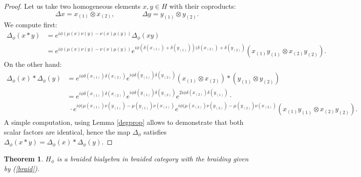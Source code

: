 \documentclass[12pt]{amsart}
\newtheorem{thm}{Theorem}[section]
\theoremstyle{definition}
\numberwithin{equation}{section}
\newcommand{\cop}{\Delta}           %
\begin{document}
\begin{proof}
Let us take two homogeneous elements $x,y \in H$ with their coproducts:
$$ \Delta x = x_{(1)} \otimes  x_{(2)}, \qquad \qquad  \Delta y = y_{(1)} \otimes  y_{(2)}. $$
We compute first:
$$
\begin{aligned}
\Delta_\phi (x \ast y) & =  e^{i \phi(\mu(x) \nu(y)  - \nu(x) \mu(y))} \Delta_\phi(xy) \\
& = e^{i \phi(\mu(x) \nu(y)  - \nu(x) \mu(y))} 
e^{ i \phi (\delta(x_{(1)}) +  \delta(y_{(1)}))(\delta(x_{(2)}) + \delta(y_{(2)})}
 \left( x_{(1)} y_{(1)} \otimes  x_{(2)} y_{(2)} \right).
\end{aligned}
$$
On the other hand:
$$
\begin{aligned}
\Delta_\phi(x) \ast \Delta_\phi(y) &= 
e^{ i \phi \delta(x_{(1)})  \delta(x_{(2)})}  
e^{ i \phi \delta(y_{(1)})  \delta(y_{(2)})}  
\left( x_{(1)} \otimes  x_{(2)} \right) \ast \left( y_{(1)} \otimes  y_{(2)} \right) \\
&= 
e^{ i \phi \delta(x_{(1)})  \delta(x_{(2)})}  
e^{ i \phi \delta(y_{(1)})  \delta(y_{(2)})}  
e^{2 i \phi \delta(x_{(2)})  \delta(y_{(1)})}  \cdot \\
& \,\, \cdot e^{ i \phi (\mu(x_{(1)}) \nu(y_{(1)})  - \mu(y_{(1)}) \nu(x_{(1)})}   
e^{ i \phi (\mu(x_{(2)}) \nu(y_{(2)})  - \mu(y_{(2)}) \nu(x_{(2)})}   
\left(  x_{(1)} y_{(1)} \otimes  x_{(2)} y_{(2)} \right).
\end{aligned}
$$
A simple computation, using Lemma \ref{degprop} allows to demonstrate that both scalar factors are identical, hence the map $\Delta_\phi$ satisfies $\cop_{\phi}(x \ast y)=\cop_{\phi}(x)\ast\cop_{\phi}(y)$.
\end{proof}
\begin{thm}
\label{braidedHopf}
$H_\phi$ is a braided bialgebra in braided category with the braiding given by (\ref{braid}).
\end{thm}
\end{document}
